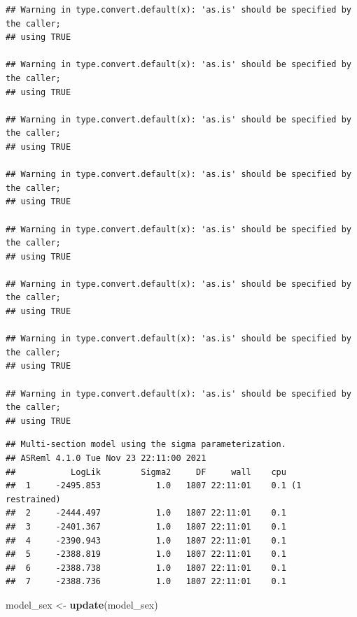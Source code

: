 \documentclass[
  12pt,
]{book}
\newenvironment{Shaded}{\begin{snugshade}}{\end{snugshade}}
\newcommand{\KeywordTok}[1]{\textcolor[rgb]{0.13,0.29,0.53}{\textbf{#1}}}
\newcommand{\NormalTok}[1]{#1}
\newcommand{\StringTok}[1]{\textcolor[rgb]{0.31,0.60,0.02}{#1}}
\begin{document}
\begin{verbatim}
## Warning in type.convert.default(x): 'as.is' should be specified by the caller;
## using TRUE

## Warning in type.convert.default(x): 'as.is' should be specified by the caller;
## using TRUE

## Warning in type.convert.default(x): 'as.is' should be specified by the caller;
## using TRUE

## Warning in type.convert.default(x): 'as.is' should be specified by the caller;
## using TRUE

## Warning in type.convert.default(x): 'as.is' should be specified by the caller;
## using TRUE

## Warning in type.convert.default(x): 'as.is' should be specified by the caller;
## using TRUE

## Warning in type.convert.default(x): 'as.is' should be specified by the caller;
## using TRUE

## Warning in type.convert.default(x): 'as.is' should be specified by the caller;
## using TRUE
\end{verbatim}

\begin{verbatim}
## Multi-section model using the sigma parameterization.
## ASReml 4.1.0 Tue Nov 23 22:11:00 2021
##           LogLik        Sigma2     DF     wall    cpu
##  1     -2495.853           1.0   1807 22:11:01    0.1 (1 restrained)
##  2     -2444.497           1.0   1807 22:11:01    0.1
##  3     -2401.367           1.0   1807 22:11:01    0.1
##  4     -2390.943           1.0   1807 22:11:01    0.1
##  5     -2388.819           1.0   1807 22:11:01    0.1
##  6     -2388.738           1.0   1807 22:11:01    0.1
##  7     -2388.736           1.0   1807 22:11:01    0.1
\end{verbatim}

\begin{Shaded}
\begin{Highlighting}[]
\NormalTok{model\_sex \textless{}{-}}\StringTok{ }\KeywordTok{update}\NormalTok{(model\_sex)}
\end{Highlighting}
\end{Shaded}
\end{document}
